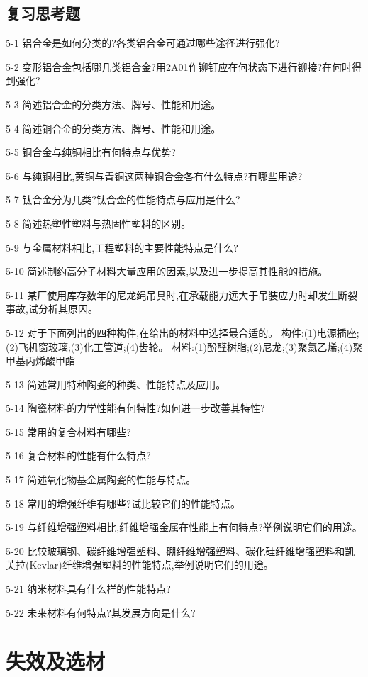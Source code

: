 \documentclass[UTF8]{ctexbook}
\newcommand{\◎}{\ensuremath{\bigcirc}}
\begin{document}
\section*{复习思考题}

 
5-1 铝合金是如何分类的?各类铝合金可通过哪些途径进行强化?

5-2 变形铝合金包括哪几类铝合金?用2A01作铆钉应在何状态下进行铆接?在何时得到强化?

5-3 简述铝合金的分类方法、牌号、性能和用途。

5-4 简述铜合金的分类方法、牌号、性能和用途。

5-5 铜合金与纯铜相比有何特点与优势?

5-6 与纯铜相比,黄铜与青铜这两种铜合金各有什么特点?有哪些用途?

5-7 钛合金分为几类?钛合金的性能特点与应用是什么?

5-8 简述热塑性塑料与热固性塑料的区别。

5-9 与金属材料相比,工程塑料的主要性能特点是什么?

5-10 简述制约高分子材料大量应用的因素,以及进一步提高其性能的措施。

5-11 某厂使用库存数年的尼龙绳吊具时,在承载能力远大于吊装应力时却发生断裂事故,试分析其原因。

5-12 对于下面列出的四种构件,在给出的材料中选择最合适的。
构件:(1)电源插座;(2)飞机窗玻璃;(3)化工管道;(4)齿轮。
材料:(1)酚醛树脂;(2)尼龙;(3)聚氯乙烯;(4)聚甲基丙烯酸甲酯

5-13 简述常用特种陶瓷的种类、性能特点及应用。

5-14 陶瓷材料的力学性能有何特性?如何进一步改善其特性?

5-15 常用的复合材料有哪些?

5-16 复合材料的性能有什么特点?

5-17 简述氧化物基金属陶瓷的性能与特点。

5-18 常用的增强纤维有哪些?试比较它们的性能特点。

5-19 与纤维增强塑料相比,纤维增强金属在性能上有何特点?举例说明它们的用途。

5-20 比较玻璃钢、碳纤维增强塑料、硼纤维增强塑料、碳化硅纤维增强塑料和凯芙拉(Kevlar)纤维增强塑料的性能特点,举例说明它们的用途。

5-21 纳米材料具有什么样的性能特点?

5-22 未来材料有何特点?其发展方向是什么?


\chapter{失效及选材}
\end{document}

